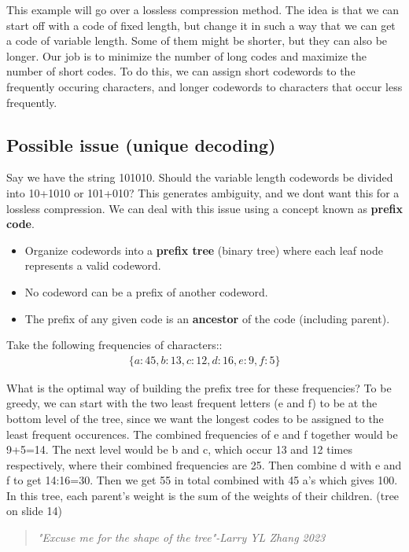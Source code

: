 \documentclass[12pt]{book}
\begin{document}
This example will go over a lossless compression method. The idea is that we can start off with a code of fixed length, but change it in such a way that we can get a code of variable length. Some of them might be shorter, but they can also be longer. Our job is to minimize the number of long codes and maximize the number of short codes. To do this, we can assign short codewords to the frequently occuring characters, and longer codewords to characters that occur less frequently.

\subsection*{Possible issue (unique decoding)}

Say we have the string 101010. Should the variable length codewords be divided into 10+1010 or 101+010? This generates ambiguity, and we dont want this for a lossless compression. We can deal with this issue using a concept known as \textbf{prefix code}.

\begin{itemize}
    \item Organize codewords into a \textbf{prefix tree} (binary tree) where each leaf node represents a valid codeword.
    \item No codeword can be a prefix of another codeword.
    \item The prefix of any given code is an \textbf{ancestor} of the code (including parent).
\end{itemize}

Take the following frequencies of characters::
\begin{align*}
    \{a:45, b:13, c:12, d:16, e:9, f:5\}
\end{align*}

What is the optimal way of building the prefix tree for these frequencies? To be greedy, we can start with the two least frequent letters (e and f) to be at the bottom level of the tree, since we want the longest codes to be assigned to the least frequent occurences. The combined frequencies of e and f together would be 9+5=14. The next level would be b and c, which occur 13 and 12 times respectively, where their combined frequencies are 25. Then combine d with e and f to get 14:16=30. Then we get 55 in total combined with 45 a's which gives 100. In this tree, each parent's weight is the sum of the weights of their children. (tree on slide 14)\\

\begin{quote}
    \textit{"Excuse me for the shape of the tree"-Larry YL Zhang 2023}
\end{quote}
\end{document}

